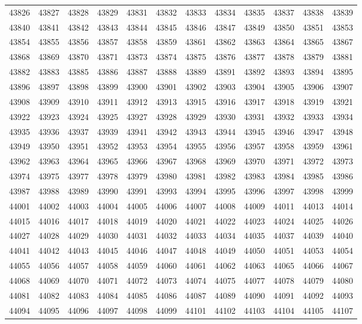 \begin{center}
\begin{longtable}{llllllllllll}
43826 &43827 &43828 &43829 &43831 &43832 &43833 &43834 &43835 &43837 &43838 &43839 \\
43840 &43841 &43842 &43843 &43844 &43845 &43846 &43847 &43849 &43850 &43851 &43853 \\
43854 &43855 &43856 &43857 &43858 &43859 &43861 &43862 &43863 &43864 &43865 &43867 \\
43868 &43869 &43870 &43871 &43873 &43874 &43875 &43876 &43877 &43878 &43879 &43881 \\
43882 &43883 &43885 &43886 &43887 &43888 &43889 &43891 &43892 &43893 &43894 &43895 \\
43896 &43897 &43898 &43899 &43900 &43901 &43902 &43903 &43904 &43905 &43906 &43907 \\
43908 &43909 &43910 &43911 &43912 &43913 &43915 &43916 &43917 &43918 &43919 &43921 \\
43922 &43923 &43924 &43925 &43927 &43928 &43929 &43930 &43931 &43932 &43933 &43934 \\
43935 &43936 &43937 &43939 &43941 &43942 &43943 &43944 &43945 &43946 &43947 &43948 \\
43949 &43950 &43951 &43952 &43953 &43954 &43955 &43956 &43957 &43958 &43959 &43961 \\
43962 &43963 &43964 &43965 &43966 &43967 &43968 &43969 &43970 &43971 &43972 &43973 \\
43974 &43975 &43977 &43978 &43979 &43980 &43981 &43982 &43983 &43984 &43985 &43986 \\
43987 &43988 &43989 &43990 &43991 &43993 &43994 &43995 &43996 &43997 &43998 &43999 \\
44001 &44002 &44003 &44004 &44005 &44006 &44007 &44008 &44009 &44011 &44013 &44014 \\
44015 &44016 &44017 &44018 &44019 &44020 &44021 &44022 &44023 &44024 &44025 &44026 \\
44027 &44028 &44029 &44030 &44031 &44032 &44033 &44034 &44035 &44037 &44039 &44040 \\
44041 &44042 &44043 &44045 &44046 &44047 &44048 &44049 &44050 &44051 &44053 &44054 \\
44055 &44056 &44057 &44058 &44059 &44060 &44061 &44062 &44063 &44065 &44066 &44067 \\
44068 &44069 &44070 &44071 &44072 &44073 &44074 &44075 &44077 &44078 &44079 &44080 \\
44081 &44082 &44083 &44084 &44085 &44086 &44087 &44089 &44090 &44091 &44092 &44093 \\
44094 &44095 &44096 &44097 &44098 &44099 &44101 &44102 &44103 &44104 &44105 &44107 \\

\end{longtable}
\end{center}
